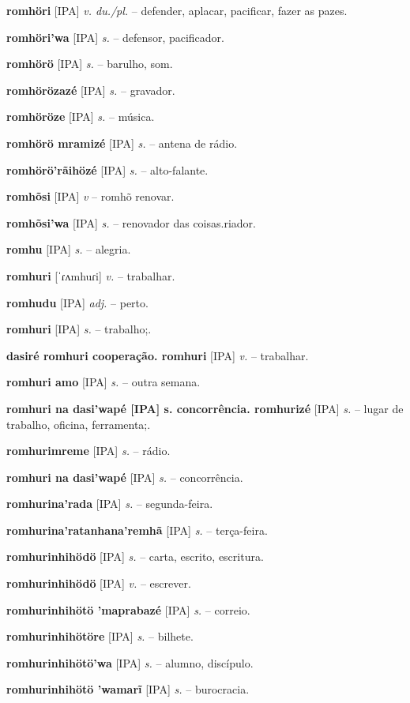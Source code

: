 \textbf{romhöri} [IPA] \textit{v. du./pl.} -- defender, aplacar, pacificar, fazer as pazes.

\textbf{romhöri'wa} [IPA] \textit{s.} -- defensor, pacificador.

\textbf{romhörö} [IPA] \textit{s.} -- barulho, som.

\textbf{romhörözazé} [IPA] \textit{s.} -- gravador.

\textbf{romhöröze} [IPA] \textit{s.} -- música.

\textbf{romhörö mramizé} [IPA] \textit{s.} -- antena de rádio.

\textbf{romhörö'rãihözé} [IPA] \textit{s.} -- alto-falante.

\textbf{romhõsi} [IPA] \textit{v} -- romhõ renovar.

\textbf{romhõsi'wa} [IPA] \textit{s.} -- renovador das coisas.riador.

\textbf{romhu} [IPA] \textit{s.} -- alegria.

\textbf{romhuri} [ˈɾʌmhuɾi] \textit{v.} -- trabalhar.

\textbf{romhudu} [IPA] \textit{adj.} -- perto.

\textbf{romhuri} [IPA] \textit{s.} -- trabalho;.

\textbf{dasiré romhuri cooperação. romhuri} [IPA] \textit{v.} -- trabalhar.

\textbf{romhuri amo} [IPA] \textit{s.} -- outra semana.

\textbf{romhuri na dasi'wapé [IPA] s. concorrência. romhurizé} [IPA] \textit{s.} -- lugar de trabalho, oficina, ferramenta;.

\textbf{romhurimreme} [IPA] \textit{s.} -- rádio.

\textbf{romhuri na dasi'wapé} [IPA] \textit{s.} -- concorrência.

\textbf{romhurina'rada} [IPA] \textit{s.} -- segunda-feira.

\textbf{romhurina'ratanhana'remhã} [IPA] \textit{s.} -- terça-feira.

\textbf{romhurinhihödö} [IPA] \textit{s.} -- carta, escrito, escritura.

\textbf{romhurinhihödö} [IPA] \textit{v.} -- escrever.

\textbf{romhurinhihötö 'maprabazé} [IPA] \textit{s.} -- correio.

\textbf{romhurinhihötöre} [IPA] \textit{s.} -- bilhete.

\textbf{romhurinhihötö'wa} [IPA] \textit{s.} -- alumno, discípulo.

\textbf{romhurinhihötö 'wamarĩ} [IPA] \textit{s.} -- burocracia.

